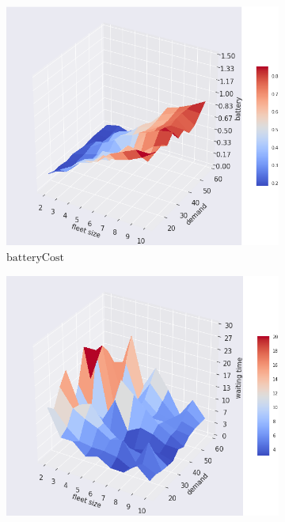 \documentclass[12pt,a4paper]{article}
\begin{document}
\begin{figure}
\caption{Simulations' output metrics with respect to the fleet size $|V|$ (x-axis) and the demand density $dem$ (y-axis)}
  \centering
\begin{subfigure}[b]{0.452\textwidth}
  \includegraphics[width=\linewidth]{./images/battery.png}
  \caption{$\text{batteryCost}$}
  \label{batteryCost}
\end{subfigure}
\begin{subfigure}[b]{0.45\textwidth}
  \includegraphics[width=\linewidth]{./images/waitingtime.png}

\end{subfigure}
\end{figure}
\end{document}

